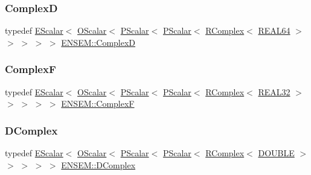 \subsubsection{\texorpdfstring{ComplexD}{ComplexD}}
{\footnotesize\ttfamily typedef \mbox{\hyperlink{classENSEM_1_1EScalar}{E\+Scalar}}$<$ \mbox{\hyperlink{classENSEM_1_1OScalar}{O\+Scalar}}$<$ \mbox{\hyperlink{classENSEM_1_1PScalar}{P\+Scalar}}$<$ \mbox{\hyperlink{classENSEM_1_1PScalar}{P\+Scalar}}$<$ \mbox{\hyperlink{classENSEM_1_1RComplex}{R\+Complex}}$<$ \mbox{\hyperlink{namespaceENSEM_a85b215b9f1f43715aebee01718e25082}{R\+E\+A\+L64}} $>$ $>$ $>$ $>$ $>$ \mbox{\hyperlink{group__defs_gaf38ee8c84f090ee0c3b76e7a384fb316}{E\+N\+S\+E\+M\+::\+ComplexD}}}

\mbox{\label{group__defs_ga9d343936e63ca257d34c7e2198e549d7}} 
\subsubsection{\texorpdfstring{ComplexF}{ComplexF}}
{\footnotesize\ttfamily typedef \mbox{\hyperlink{classENSEM_1_1EScalar}{E\+Scalar}}$<$ \mbox{\hyperlink{classENSEM_1_1OScalar}{O\+Scalar}}$<$ \mbox{\hyperlink{classENSEM_1_1PScalar}{P\+Scalar}}$<$ \mbox{\hyperlink{classENSEM_1_1PScalar}{P\+Scalar}}$<$ \mbox{\hyperlink{classENSEM_1_1RComplex}{R\+Complex}}$<$ \mbox{\hyperlink{namespaceENSEM_a7540d01191172323e9073283d772576d}{R\+E\+A\+L32}} $>$ $>$ $>$ $>$ $>$ \mbox{\hyperlink{group__defs_ga9d343936e63ca257d34c7e2198e549d7}{E\+N\+S\+E\+M\+::\+ComplexF}}}

\mbox{\label{group__defs_ga06619af4c8e964a05d234fc7113321a6}} 
\subsubsection{\texorpdfstring{DComplex}{DComplex}}
{\footnotesize\ttfamily typedef \mbox{\hyperlink{classENSEM_1_1EScalar}{E\+Scalar}}$<$ \mbox{\hyperlink{classENSEM_1_1OScalar}{O\+Scalar}}$<$ \mbox{\hyperlink{classENSEM_1_1PScalar}{P\+Scalar}}$<$ \mbox{\hyperlink{classENSEM_1_1PScalar}{P\+Scalar}}$<$ \mbox{\hyperlink{classENSEM_1_1RComplex}{R\+Complex}}$<$ \mbox{\hyperlink{namespaceENSEM_adcbd0de4e9e0e7ef6aa9b681a554e2c5}{D\+O\+U\+B\+LE}} $>$ $>$ $>$ $>$ $>$ \mbox{\hyperlink{group__defs_ga06619af4c8e964a05d234fc7113321a6}{E\+N\+S\+E\+M\+::\+D\+Complex}}}

